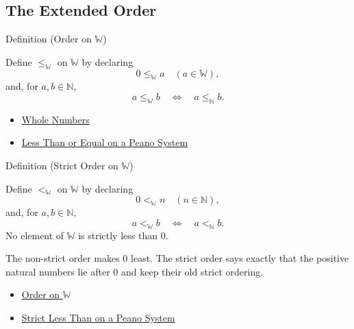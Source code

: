 \subsection*{The Extended Order}

\begin{definitionbox}{Definition (Order on \texorpdfstring{$\mathbb{W}$}{W})}
\begin{definition}
\label{def:order-on-w}
Define $\leq_{\mathbb{W}}$ on $\mathbb{W}$ by declaring
\[
0\leq_{\mathbb{W}}a\quad(a\in\mathbb{W}),
\]
and, for $a,b\in\mathbb{N}$,
\[
a\leq_{\mathbb{W}}b
\quad\Longleftrightarrow\quad
a\leq_{\mathbb{N}}b.
\]
\end{definition}
\end{definitionbox}

\begin{dependencies}
\begin{itemize}
  \item \hyperref[def:whole-numbers]{Whole Numbers}
  \item \hyperref[def:less-than-or-equal-on-peano-system]{Less Than or Equal on a Peano System}
\end{itemize}
\end{dependencies}

\begin{definitionbox}{Definition (Strict Order on \texorpdfstring{$\mathbb{W}$}{W})}
\begin{definition}
\label{def:strict-order-on-w}
Define $<_{\mathbb{W}}$ on $\mathbb{W}$ by declaring
\[
0<_{\mathbb{W}}n\quad(n\in\mathbb{N}),
\]
and, for $a,b\in\mathbb{N}$,
\[
a<_{\mathbb{W}}b
\quad\Longleftrightarrow\quad
a<_{\mathbb{N}}b.
\]
No element of $\mathbb{W}$ is strictly less than $0$.
\end{definition}
\end{definitionbox}

\begin{remark*}[Interpretation]
The non-strict order makes $0$ least. The strict order says exactly that the
positive natural numbers lie after $0$ and keep their old strict ordering.
\end{remark*}

\begin{dependencies}
\begin{itemize}
  \item \hyperref[def:order-on-w]{Order on $\mathbb{W}$}
  \item \hyperref[def:strict-less-than-on-peano-system]{Strict Less Than on a Peano System}
\end{itemize}
\end{dependencies}

